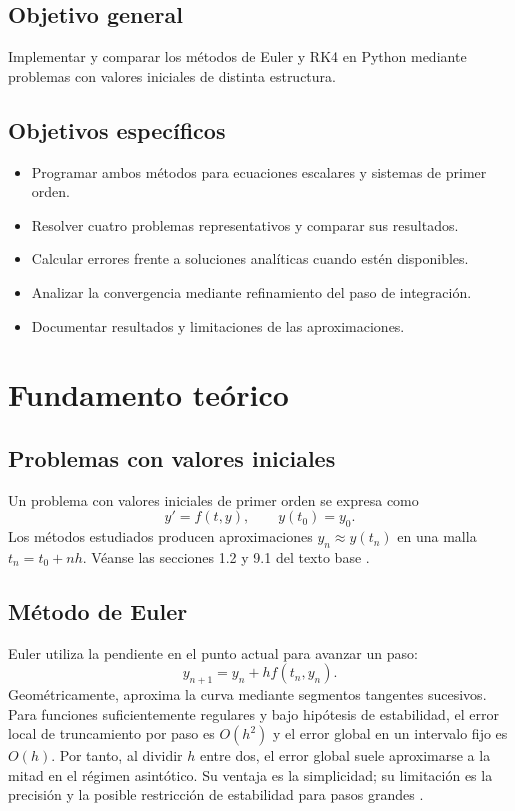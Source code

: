 \documentclass[12pt,letterpaper]{article}
\begin{document}
\subsection{Objetivo general}
Implementar y comparar los métodos de Euler y RK4 en Python mediante problemas con valores iniciales de distinta estructura.
\subsection{Objetivos específicos}
\begin{itemize}
\item Programar ambos métodos para ecuaciones escalares y sistemas de primer orden.
\item Resolver cuatro problemas representativos y comparar sus resultados.
\item Calcular errores frente a soluciones analíticas cuando estén disponibles.
\item Analizar la convergencia mediante refinamiento del paso de integración.
\item Documentar resultados y limitaciones de las aproximaciones.
\end{itemize}
\section{Fundamento teórico}
\subsection{Problemas con valores iniciales}
Un problema con valores iniciales de primer orden se expresa como
\begin{equation}y'=f(t,y),\qquad y(t_0)=y_0.\end{equation}
Los métodos estudiados producen aproximaciones $y_n\approx y(t_n)$ en una malla $t_n=t_0+nh$. Véanse las secciones 1.2 y 9.1 del texto base \cite{zill2009}.
\subsection{Método de Euler}
Euler utiliza la pendiente en el punto actual para avanzar un paso:
\begin{equation}\boxed{y_{n+1}=y_n+h f(t_n,y_n).}\end{equation}
Geométricamente, aproxima la curva mediante segmentos tangentes sucesivos. Para funciones suficientemente regulares y bajo hipótesis de estabilidad, el error local de truncamiento por paso es $O(h^2)$ y el error global en un intervalo fijo es $O(h)$. Por tanto, al dividir $h$ entre dos, el error global suele aproximarse a la mitad en el régimen asintótico. Su ventaja es la simplicidad; su limitación es la precisión y la posible restricción de estabilidad para pasos grandes \cite[sec.~9.1]{zill2009}.
\end{document}
